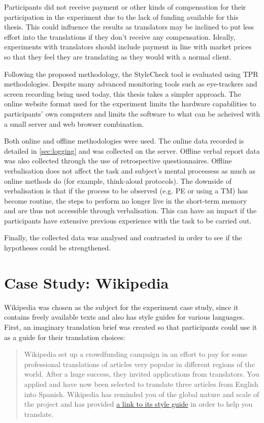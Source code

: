 Participants did not receive payment or other kinds of compensation for their participation in the experiment due to the lack of funding available for this thesis. This could influence the results as translators may be inclined to put less effort into the translations if they don't receive any compensation. Ideally, experiments with translators should include payment in line with market prices so that they feel they are translating as they would with a normal client.

Following the proposed methodology, the StyleCheck tool is evaluated using \ac{TPR} methodologies. Despite many advanced monitoring tools such as eye-trackers and screen recording being used today, this thesis takes a simpler approach. The online website format used for the experiment limits the hardware capabilities to participants' own computers and limits the software to what can be acheived with a small server and web browser combination.

Both online and offline methodologies were used. The online data recorded is detailed in \autoref{sec:logging} and was collected on the server. Offline verbal report data was also collected through the use of retrospective questionnaires. Offline verbalisation does not affect the task and subject's mental processess as much as online methods do (for example, think-aloud protocols). The downside of verbalisation is that if the process to be observed (e.g. \ac{PE} or using a \ac{TM}) has become routine, the steps to perform no longer live in the short-term memory and are thus not accessible through verbalisation. This can have an impact if the participants have extensive previous experience with the task to be carried out. 

Finally, the collected data was analysed and contrasted in order to see if the hypotheses could be strengthened.


\section{Case Study: Wikipedia}

\noindent Wikipedia was chosen as the subject for the experiment case study, since it contains freely available texts and also has style guides for various languages. First, an imaginary translation brief was created so that participants could use it as a guide for their translation choices:

\begin{quote}
Wikipedia set up a crowdfunding campaign in an effort to pay for some professional translations of articles very popular in different regions of the world. After a huge success, they invited applications from translators. You applied and have now been selected to translate three articles from English into Spanish. Wikipedia has reminded you of the global nature and scale of the project and has provided \href{http://es.wikipedia.org/wiki/Wikipedia:Manual_de_estilo}{a link to its style guide} in order to help you translate.
\end{quote}


